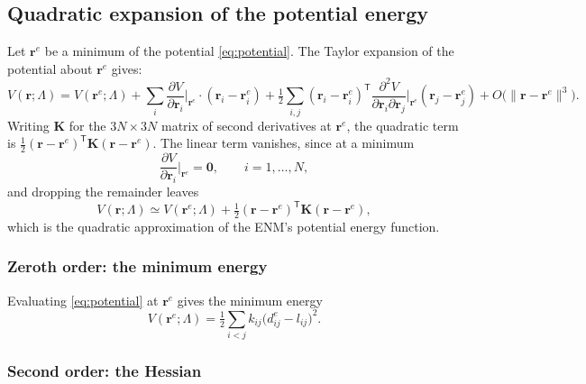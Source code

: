 \documentclass[11pt]{article}
\newcommand{\rr}{\mathbf{r}}
\newcommand{\KK}{\mathbf{K}}
\newcommand{\LL}{\Lambda}
\newcommand{\re}{\rr^{e}}
\newcommand{\dije}{d^{e}_{ij}}
\newcommand{\lij}{l_{ij}}
\newcommand{\kij}{k_{ij}}
\begin{document}
\subsection{Quadratic expansion of the potential energy}
\label{sec:expansion}

Let $\re$ be a minimum of the potential \eqref{eq:potential}.
The Taylor expansion of the potential about $\re$ gives:
\begin{equation}
V(\rr;\LL) = V(\re;\LL)
+ \sum_i \frac{\partial V}{\partial \rr_i}\bigg|_{\re}\cdot (\rr_i - \re_i)
+ \tfrac12 \sum_{i,j} (\rr_i - \re_i)^{\mathsf T}
\frac{\partial^2 V}{\partial \rr_i \partial \rr_j}\bigg|_{\re} (\rr_j - \re_j)
+ O\big(\lVert\rr - \re\rVert^3\big).
\label{eq:taylor-expansion}
\end{equation}
Writing $\KK$ for the $3N \times 3N$ matrix of second derivatives at $\re$, the quadratic term is $\tfrac12(\rr-\re)^{\mathsf T}\KK(\rr-\re)$.
The linear term vanishes, since at a minimum
\begin{equation}
\frac{\partial V}{\partial \rr_i}\bigg|_{\re} = \mathbf{0},
\qquad i = 1,\ldots,N,
\label{eq:equilibrium-condition}
\end{equation}
and dropping the remainder leaves
\begin{equation}
\boxed{
V(\rr;\LL) \simeq 
V(\re;\LL) + \tfrac12 (\rr - \re)^{\mathsf T} \KK (\rr - \re),
}
\label{eq:quadratic-approximation}
\end{equation}
which is the quadratic approximation of the ENM's potential energy function.

\subsubsection{Zeroth order: the minimum energy}

Evaluating \eqref{eq:potential} at $\re$ gives the minimum energy
\begin{equation}
\boxed{
V(\re; \LL) = \tfrac12 \sum_{i<j} \kij \big(\dije - \lij\big)^{2}.
}
\label{eq:minimum-energy}
\end{equation}

\subsubsection{Second order: the Hessian}
\end{document}
